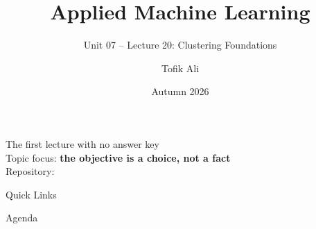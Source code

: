 \documentclass[aspectratio=169]{beamer}
\title[Applied Machine Learning]{Applied Machine Learning}
\subtitle{Unit 07 -- Lecture 20: Clustering Foundations}
\author{Tofik Ali}
\institute{School of Computer Science, UPES Dehradun}
\date{Autumn 2026}
\begin{document}
\UPESCoverFrame
\setcounter{framenumber}{0}

\begin{frame}
  \titlepage
  \begin{center}
    \footnotesize The first lecture with no answer key\\[0.25em]
    \footnotesize Topic focus: \textbf{the objective is a choice, not a fact}\\[0.25em]
    \footnotesize Repository: \texttt{\AMLRepoURL}
  \end{center}
  \slidesources{\AMLUnitVIISources}
\end{frame}

\begin{frame}{Quick Links}
  \centering
  \hyperlink{sec:why}{}\hspace{0.4em}
  \hyperlink{sec:noright}{}\hspace{0.4em}
  \hyperlink{sec:tax}{}\hspace{0.4em}
  \hyperlink{sec:stats}{}\\[0.6em]
  \hyperlink{sec:valid}{}\hspace{0.4em}
  \hyperlink{sec:prep}{}\hspace{0.4em}
  \hyperlink{sec:apps}{}\hspace{0.4em}
  \hyperlink{sec:summary}{}
\end{frame}

\begin{frame}{Agenda}
  \tableofcontents
\end{frame}
\end{document}
